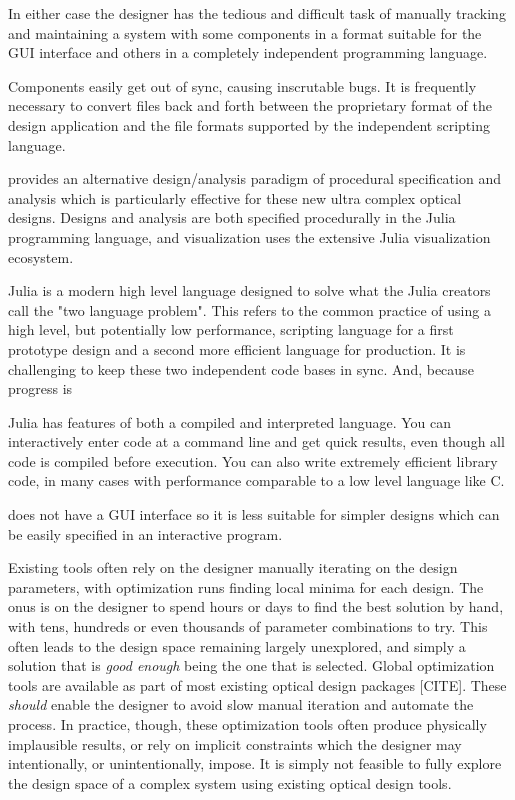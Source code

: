 \documentclass{juliacon}
\begin{document}
In either case the designer has the tedious and difficult task of manually tracking and maintaining a system with some components in a format suitable for the GUI interface and others in a completely independent programming language.

Components easily get out of sync, causing inscrutable bugs. It is frequently necessary to convert files back and forth between the proprietary format of the design application and the file formats supported by the independent scripting language.

\OpticSim{} provides an alternative design/analysis paradigm of procedural specification and analysis which is particularly effective for these new ultra complex optical designs. Designs and analysis are both specified procedurally in the Julia programming language, and visualization uses the extensive Julia visualization ecosystem.

Julia is a modern high level language designed to solve what the Julia creators call the "two language problem". This refers to the common practice of using a high level, but potentially low performance, scripting language for a first prototype design and a second more efficient language for production. It is challenging to keep these two independent code bases in sync. And, because progress is

Julia has features of both a compiled and interpreted language. You can interactively enter code at a command line and get quick results, even though all code is compiled before execution. You can also write extremely efficient library code, in many cases with performance comparable to a low level language like C.

\OpticSim{} does not have a GUI interface so it is less suitable for simpler designs which can be easily specified in an interactive program.

Existing tools often rely on the designer manually iterating on the design parameters, with optimization runs finding local minima for each design.
The onus is on the designer to spend hours or days to find the best solution by hand, with tens, hundreds or even thousands of parameter combinations to try.
This often leads to the design space remaining largely unexplored, and simply a solution that is \emph{good enough} being the one that is selected.
Global optimization tools are available as part of most existing optical design packages [CITE].
These \emph{should} enable the designer to avoid slow manual iteration and automate the process.
In practice, though, these optimization tools often produce physically implausible results, or rely on implicit constraints which the designer may intentionally, or unintentionally, impose.
It is simply not feasible to fully explore the design space of a complex system using existing optical design tools.
\end{document}

